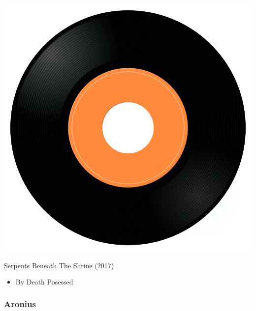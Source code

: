 \begin{minipage}[t]{0.25\textwidth}\vspace{0pt}
\captionsetup{type=figure}
\includegraphics[width=\textwidth]{Images/cover.png}
\caption*{Serpents Beneath The Shrine (2017)}
\end{minipage}
\begin{minipage}[t]{0.25\textwidth}\vspace{0pt}
\begin{itemize}[nosep,leftmargin=1em,labelwidth=*,align=left]
	\setlength{\itemsep}{0pt}
	\item By Death Posessed
\end{itemize}
\end{minipage}

\subsubsection{Aronius}

